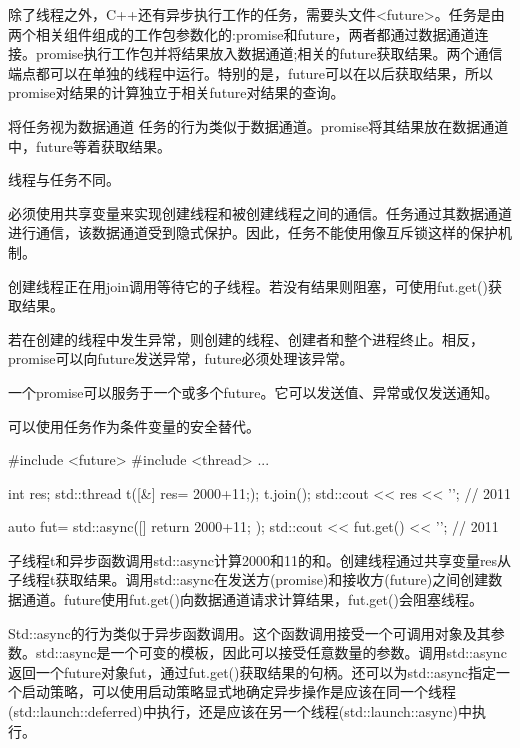 除了线程之外，C++还有异步执行工作的任务，需要头文件<future>。任务是由两个相关组件组成的工作包参数化的:promise和future，两者都通过数据通道连接。promise执行工作包并将结果放入数据通道;相关的future获取结果。两个通信端点都可以在单独的线程中运行。特别的是，future可以在以后获取结果，所以promise对结果的计算独立于相关future对结果的查询。

\begin{myTip}{将任务视为数据通道}
任务的行为类似于数据通道。promise将其结果放在数据通道中，future等着获取结果。

\end{myTip}


线程与任务不同。

必须使用共享变量来实现创建线程和被创建线程之间的通信。任务通过其数据通道进行通信，该数据通道受到隐式保护。因此，任务不能使用像互斥锁这样的保护机制。

创建线程正在用join调用等待它的子线程。若没有结果则阻塞，可使用fut.get()获取结果。

若在创建的线程中发生异常，则创建的线程、创建者和整个进程终止。相反，promise可以向future发送异常，future必须处理该异常。

一个promise可以服务于一个或多个future。它可以发送值、异常或仅发送通知。

可以使用任务作为条件变量的安全替代。

\begin{cpp}
#include <future>
#include <thread>
...

int res;
std::thread t([&]{ res= 2000+11;});
t.join();
std::cout << res << '\n'; // 2011

auto fut= std::async([]{ return 2000+11; });
std::cout << fut.get() << '\n'; // 2011
\end{cpp}

子线程t和异步函数调用std::async计算2000和11的和。创建线程通过共享变量res从子线程t获取结果。调用std::async在发送方(promise)和接收方(future)之间创建数据通道。future使用fut.get()向数据通道请求计算结果，fut.get()会阻塞线程。


Std::async的行为类似于异步函数调用。这个函数调用接受一个可调用对象及其参数。std::async是一个可变的模板，因此可以接受任意数量的参数。调用std::async返回一个future对象fut，通过fut.get()获取结果的句柄。还可以为std::async指定一个启动策略，可以使用启动策略显式地确定异步操作是应该在同一个线程(std::launch::deferred)中执行，还是应该在另一个线程(std::launch::async)中执行。

